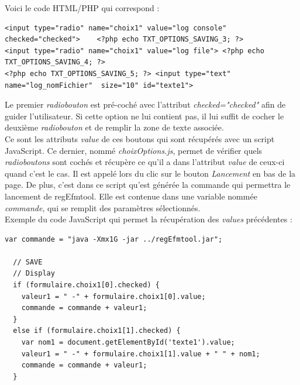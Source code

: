 Voici le code HTML/PHP qui correspond :

\scriptsize
\begin{DDbox}{\linewidth}
\begin{lstlisting}
<input type="radio" name="choix1" value="log console" checked="checked">	<?php echo TXT_OPTIONS_SAVING_3; ?> 
<input type="radio" name="choix1" value="log file"> <?php echo TXT_OPTIONS_SAVING_4; ?> 
<?php echo TXT_OPTIONS_SAVING_5; ?> <input type="text"	 name="log_nomFichier" 	size="10" id="texte1">
\end{lstlisting}
\end{DDbox}

\normalsize

Le premier \textit{radiobouton} est pré-coché avec l'attribut \textit{checked="checked"} afin de guider l'utilisateur. Si cette option ne lui contient pas, il lui suffit de cocher le deuxième \textit{radiobouton} et de remplir la zone de texte associée. \\

Ce sont les attributs \textit{value} de ces boutons qui sont récupérés avec un script JavaScript. Ce dernier, nommé \emph{choixOptions.js}, permet de vérifier quels \textit{radioboutons} sont cochés et récupère ce qu'il a dans l'attribut \textit{value} de ceux-ci quand c'est le cas. Il est appelé lors du clic sur le bouton \textit{Lancement} en bas de la page. De plus, c'est dans ce script qu'est générée la commande qui permettra le lancement de regEfmtool. Elle est contenue dans une variable nommée  \textit{commande}, qui se remplit des paramètres sélectionnés. \\

Exemple du code JavaScript qui permet la récupération des \textit{values} précédentes : \\

\begin{DDbox}{\linewidth}
\begin{lstlisting}
var commande = "java -Xmx1G -jar ../regEfmtool.jar";

  // SAVE
  // Display
  if (formulaire.choix1[0].checked) { 
    valeur1 = " -" + formulaire.choix1[0].value; 
    commande = commande + valeur1;
  }
  else if (formulaire.choix1[1].checked) { 
    var nom1 = document.getElementById('texte1').value;
    valeur1 = " -" + formulaire.choix1[1].value + " " + nom1; 
    commande = commande + valeur1;
  }
\end{lstlisting}
\end{DDbox}

